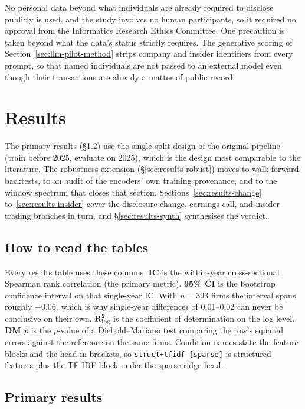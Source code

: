 \documentclass[logo,msc,ai]{infthesis}        %
\begin{document}
No personal data beyond what individuals are already required to disclose publicly is used, and the study involves no human participants, so it required no approval from the Informatics Research Ethics Committee. One precaution is taken beyond what the data's status strictly requires. The generative scoring of Section~\ref{sec:llm-pilot-method} strips company and insider identifiers from every prompt, so that named individuals are not passed to an external model even though their transactions are already a matter of public record.

\chapter{Results}
\label{sec:results}

The primary results (\S\ref{sec:results-primary}) use the single-split design of the original pipeline (train before 2025, evaluate on 2025), which is the design most comparable to the literature. The robustness extension (\S\ref{sec:results-robust}) moves to walk-forward backtests, to an audit of the encoders' own training provenance, and to the window spectrum that closes that section. Sections~\ref{sec:results-change} to~\ref{sec:results-insider} cover the disclosure-change, earnings-call, and insider-trading branches in turn, and \S\ref{sec:results-synth} synthesises the verdict.

\section{How to read the tables}
Every results table uses these columns. \textbf{IC} is the within-year cross-sectional Spearman rank correlation (the primary metric). \textbf{95\% CI} is the bootstrap confidence interval on that single-year IC. With $n=393$ firms the interval spans roughly $\pm 0.06$, which is why single-year differences of 0.01--0.02 can never be conclusive on their own. $\mathbf{R^2_{\log}}$ is the coefficient of determination on the log level. \textbf{DM $p$} is the $p$-value of a Diebold--Mariano test \cite{diebold1995comparing} comparing the row's squared errors against the reference on the same firms. Condition names state the feature blocks and the head in brackets, so \texttt{struct+tfidf [sparse]} is structured features plus the TF-IDF block under the sparse ridge head.

\section{Primary results}
\label{sec:results-primary}
\end{document}
